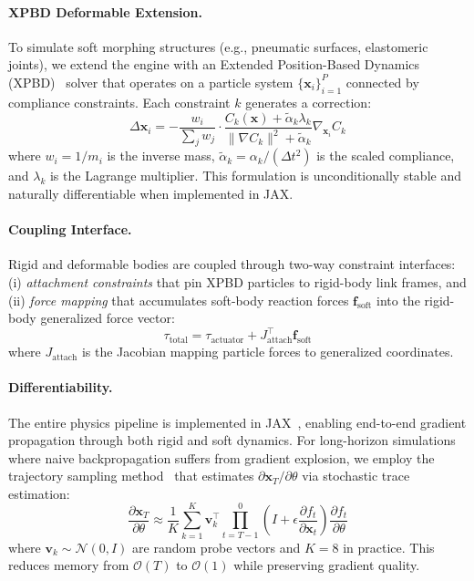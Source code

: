 \paragraph{XPBD Deformable Extension.}
To simulate soft morphing structures (e.g., pneumatic surfaces, elastomeric joints), we extend the engine with an Extended Position-Based Dynamics (XPBD)~\citep{macklin2016xpbd} solver that operates on a particle system $\{\mathbf{x}_i\}_{i=1}^{P}$ connected by compliance constraints. Each constraint $k$ generates a correction:
\begin{equation}
    \Delta \mathbf{x}_i = -\frac{w_i}{\sum_j w_j} \cdot \frac{C_k(\mathbf{x}) + \tilde{\alpha}_k \lambda_k}{\|\nabla C_k\|^2 + \tilde{\alpha}_k} \nabla_{\mathbf{x}_i} C_k
    \label{eq:xpbd}
\end{equation}
where $w_i = 1/m_i$ is the inverse mass, $\tilde{\alpha}_k = \alpha_k / (\Delta t^2)$ is the scaled compliance, and $\lambda_k$ is the Lagrange multiplier. This formulation is unconditionally stable and naturally differentiable when implemented in JAX.

\paragraph{Coupling Interface.}
Rigid and deformable bodies are coupled through two-way constraint interfaces: (i) \emph{attachment constraints} that pin XPBD particles to rigid-body link frames, and (ii) \emph{force mapping} that accumulates soft-body reaction forces $\mathbf{f}_\text{soft}$ into the rigid-body generalized force vector:
\begin{equation}
    \tau_\text{total} = \tau_\text{actuator} + J_\text{attach}^\top \mathbf{f}_\text{soft}
\end{equation}
where $J_\text{attach}$ is the Jacobian mapping particle forces to generalized coordinates.

\paragraph{Differentiability.}
The entire physics pipeline is implemented in JAX~\citep{bradbury2018jax}, enabling end-to-end gradient propagation through both rigid and soft dynamics. For long-horizon simulations where naive backpropagation suffers from gradient explosion, we employ the trajectory sampling method~\citep{jackson2024analytic} that estimates $\partial \mathbf{x}_T / \partial \theta$ via stochastic trace estimation:
\begin{equation}
    \frac{\partial \mathbf{x}_T}{\partial \theta} \approx \frac{1}{K} \sum_{k=1}^{K} \mathbf{v}_k^\top \prod_{t=T-1}^{0} \left( I + \epsilon \frac{\partial f_t}{\partial \mathbf{x}_t} \right) \frac{\partial f_t}{\partial \theta}
    \label{eq:traj_sample}
\end{equation}
where $\mathbf{v}_k \sim \mathcal{N}(0, I)$ are random probe vectors and $K=8$ in practice. This reduces memory from $\mathcal{O}(T)$ to $\mathcal{O}(1)$ while preserving gradient quality.

